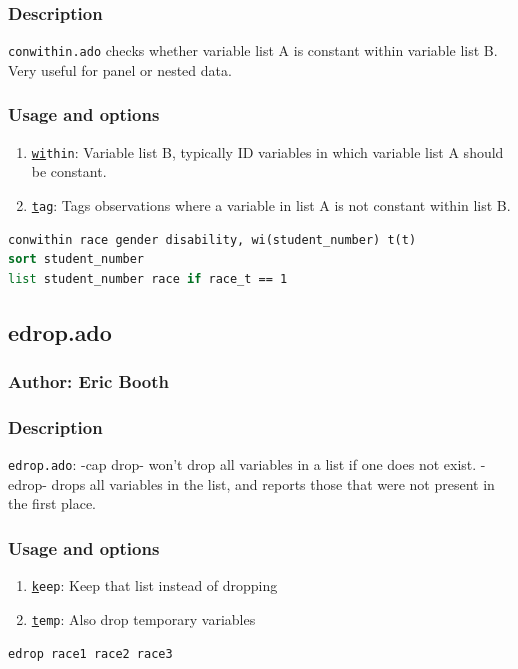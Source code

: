 {\subsubsection{Description}
\texttt{conwithin.ado} checks whether variable list A is constant within variable list B. Very useful for panel or nested data.
\subsubsection{Usage and options}
\begin{enumerate}
\item \texttt{\underline{wi}thin}: Variable list B, typically ID variables in which variable list A should be constant.
\item \texttt{\underline{t}ag}: Tags observations where a variable in list A is not constant within list B.
\end{enumerate}
\begin{lstlisting}[language=Stata, numbers=none]
conwithin race gender disability, wi(student_number) t(t)
sort student_number
list student_number race if race_t == 1
\end{lstlisting}

\subsection{edrop.ado}
\subsubsection{Author: Eric Booth}
\subsubsection{Description}
\texttt{edrop.ado}: -cap drop- won't drop all variables in a list if one does not exist. -edrop- drops all variables in the list, and reports those that were not present in the first place.
\subsubsection{Usage and options}
\begin{enumerate}
\item \texttt{\underline{k}eep}: Keep that list instead of dropping
\item \texttt{\underline{t}emp}: Also drop temporary variables
\end{enumerate}

\begin{lstlisting}[language=Stata, numbers=none]
edrop race1 race2 race3
\end{lstlisting}

}
